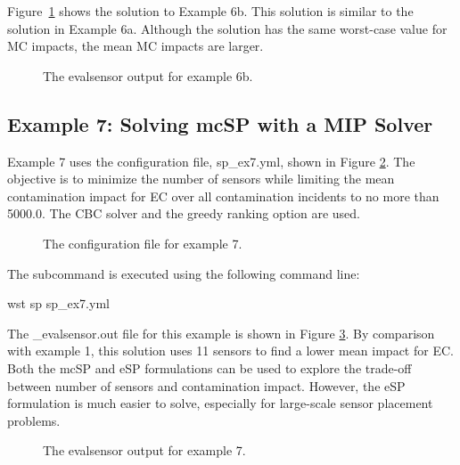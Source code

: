 Figure~\ref{fig:sp_ex6b_evalsensor} shows the solution to Example
6b.  This solution is similar to the solution in Example 6a.  Although
the solution has the same worst-case value for MC impacts, the mean
MC impacts are larger.

\begin{figure}[h]
  \caption{The evalsensor output for  example 6b.}
  \label{fig:sp_ex6b_evalsensor}
\end{figure}


\FloatBarrier 
\subsection{Example 7: Solving mcSP with a MIP Solver}
\label{sp_example7}

Example 7 uses the configuration file, sp\_ex7.yml, shown in Figure
\ref{fig:sp_ex7}. The objective is to minimize the number of sensors
while limiting the mean contamination impact for EC over all
contamination incidents to no more than 5000.0. The 
CBC solver and the greedy ranking option are used.

\begin{figure}[h]
  \caption{The  configuration file for example 7.}
  \label{fig:sp_ex7}
\end{figure}

The  subcommand is executed using the following command line:

\begin{unknownListing}
wst sp sp_ex7.yml
\end{unknownListing}

The {\outputprefix}\_evalsensor.out file for this example is shown in Figure
\ref{fig:sp_ex7_evalsensor}. By comparison with example 1, this
solution uses 11 sensors to find a lower mean impact for EC.
Both the mcSP and eSP formulations can be used to explore the
trade-off between number of sensors and contamination impact. However,
the eSP formulation is much easier to solve, especially for large-scale
sensor placement problems.

\begin{figure}[h]
  \caption{The evalsensor output for  example 7.}
  \label{fig:sp_ex7_evalsensor}
\end{figure}


